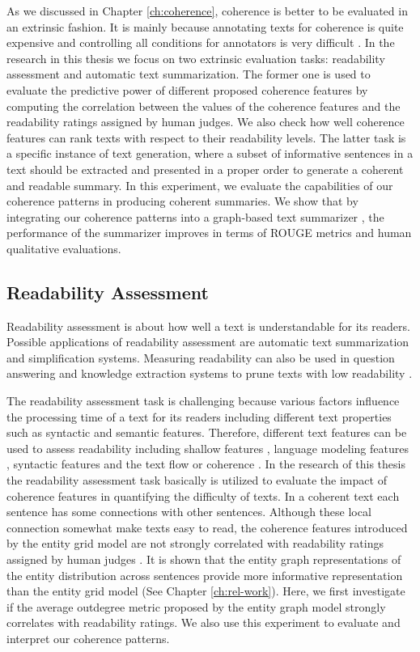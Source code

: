As we discussed in Chapter \ref{ch:coherence}, coherence is better to be evaluated in an extrinsic fashion. 
It is mainly because annotating texts for coherence is quite expensive and controlling all conditions for annotators is very difficult \cite{karamanis04a}. 
In the research in this thesis we focus on two extrinsic evaluation tasks: readability assessment and automatic text summarization. 
The former one is used to evaluate the predictive power of different proposed coherence features by computing the correlation between the values of the coherence features and the readability ratings assigned by human judges. 
We also check how well coherence features can rank texts with respect to their readability levels. 
The latter task is a specific instance of text generation, where a subset of informative sentences in a text should be extracted and presented in a proper order to generate a coherent and readable summary. 
In this experiment, we evaluate the capabilities of our coherence patterns in producing coherent summaries. 
We show that by integrating our coherence patterns into a graph-based text summarizer \cite{parveen15a}, the performance of the summarizer improves in terms of ROUGE metrics and human qualitative evaluations.

\subsection{Readability Assessment}
\label{sec:readability_assessment}

Readability assessment is about how well a text is understandable for its readers.  
Possible applications of readability assessment are automatic text summarization and simplification systems. 
Measuring readability can also be used in question answering and knowledge extraction systems to prune texts with low readability \cite{kate10}. 

The readability assessment task is challenging because various factors influence the processing time of a text for its readers including different text properties such as syntactic and semantic features.
Therefore, different text features can be used to assess readability including shallow features \cite{flesch48,kincaid75}, language modeling features \cite{siluo01,collins-thompson04}, syntactic features \cite{schwarm05} and the text flow or coherence \cite{barzilay08,pitler08}.
In the research of this thesis the readability assessment task basically is utilized to evaluate the impact of coherence features in quantifying the difficulty of texts.  
In a coherent text each sentence has some connections with other sentences. 
Although these local connection somewhat make texts easy to read, the coherence features introduced by the entity grid model \cite{barzilay08} are not strongly correlated with readability ratings assigned by human judges \cite{pitler08}.  
It is shown that the entity graph representations of the entity distribution across sentences provide more informative representation than the entity grid model (See Chapter \ref{ch:rel-work}).  
Here, we first investigate if the average outdegree metric proposed by the entity graph model strongly correlates with readability ratings. 
We also use this experiment to evaluate and interpret our coherence patterns. 

